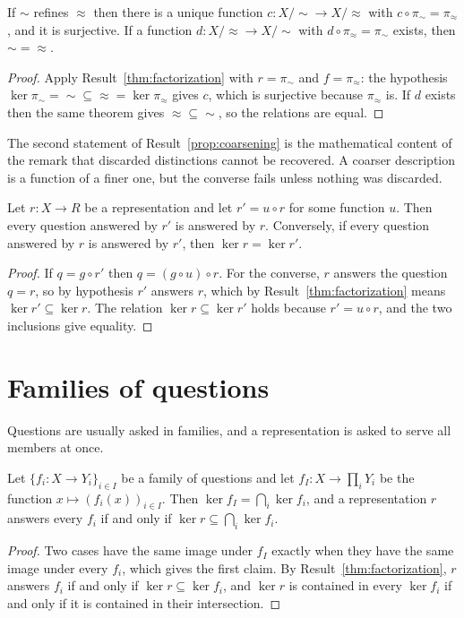 \begin{established}\label{prop:coarsening}
If $\sim$ refines $\approx$ then there is a unique function $c:X/{\sim}\to X/{\approx}$ with $c\circ\pi_{\sim}=\pi_{\approx}$, and it is surjective. If a function $d:X/{\approx}\to X/{\sim}$ with $d\circ\pi_{\approx}=\pi_\sim$ exists, then ${\sim}={\approx}$.
\end{established}
\begin{proof}
Apply Result~\ref{thm:factorization} with $r=\pi_{\sim}$ and $f=\pi_{\approx}$: the hypothesis $\ker\pi_\sim={\sim}\subseteq{\approx}=\ker\pi_\approx$ gives $c$, which is surjective because $\pi_\approx$ is. If $d$ exists then the same theorem gives ${\approx}\subseteq{\sim}$, so the relations are equal.
\end{proof}

The second statement of Result~\ref{prop:coarsening} is the mathematical content of the remark that discarded distinctions cannot be recovered. A coarser description is a function of a finer one, but the converse fails unless nothing was discarded.

\begin{established}\label{cor:norecover}
Let $r:X\to R$ be a representation and let $r'=u\circ r$ for some function $u$. Then every question answered by $r'$ is answered by $r$. Conversely, if every question answered by $r$ is answered by $r'$, then $\ker r=\ker r'$.
\end{established}
\begin{proof}
If $q=g\circ r'$ then $q=(g\circ u)\circ r$. For the converse, $r$ answers the question $q=r$, so by hypothesis $r'$ answers $r$, which by Result~\ref{thm:factorization} means $\ker r'\subseteq\ker r$. The relation $\ker r\subseteq\ker r'$ holds because $r'=u\circ r$, and the two inclusions give equality.
\end{proof}

\section{Families of questions}

Questions are usually asked in families, and a representation is asked to serve all members at once.

\begin{established}\label{prop:joint}
Let $\{f_i:X\to Y_i\}_{i\in I}$ be a family of questions and let $f_I:X\to\prod_iY_i$ be the function $x\mapsto(f_i(x))_{i\in I}$. Then $\ker f_I=\bigcap_i\ker f_i$, and a representation $r$ answers every $f_i$ if and only if $\ker r\subseteq\bigcap_i\ker f_i$.
\end{established}
\begin{proof}
Two cases have the same image under $f_I$ exactly when they have the same image under every $f_i$, which gives the first claim. By Result~\ref{thm:factorization}, $r$ answers $f_i$ if and only if $\ker r\subseteq\ker f_i$, and $\ker r$ is contained in every $\ker f_i$ if and only if it is contained in their intersection.
\end{proof}

